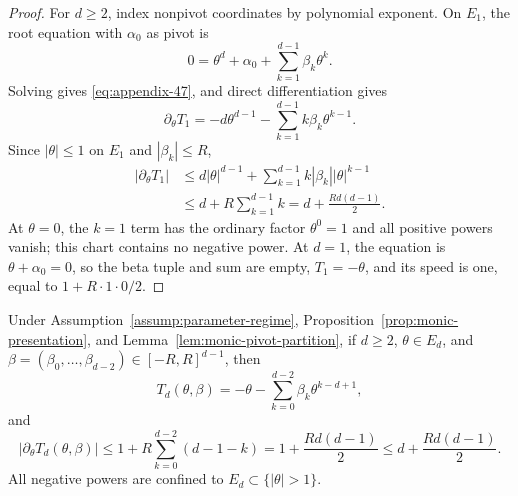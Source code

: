 \begin{proof}
For $d\geq2$, index nonpivot coordinates by polynomial exponent.  On $E_1$,
the root equation with $\alpha_0$ as pivot is
\[
0=\theta^d+\alpha_0+\sum_{k=1}^{d-1}\beta_k\theta^k.
\]
Solving gives \eqref{eq:appendix-47}, and direct differentiation gives
\[
\partial_\theta T_1
=-d\theta^{d-1}-\sum_{k=1}^{d-1}k\beta_k\theta^{k-1}.
\]
Since $|\theta|\leq1$ on $E_1$ and $|\beta_k|\leq R$,
\[
\begin{aligned}
|\partial_\theta T_1|
&\leq d|\theta|^{d-1}
 +\sum_{k=1}^{d-1}k|\beta_k||\theta|^{k-1}\\
&\leq d+R\sum_{k=1}^{d-1}k
=d+\frac{Rd(d-1)}2.
\end{aligned}
\]
At $\theta=0$, the $k=1$ term has the ordinary factor
$\theta^0=1$ and all positive powers vanish; this chart contains no negative
power.  At $d=1$, the equation is $\theta+\alpha_0=0$, so the beta tuple and
sum are empty, $T_1=-\theta$, and its speed is one, equal to
$1+R\cdot1\cdot0/2$.
\end{proof}

\begin{lemma}
\label{lem:monic-high-chart}
Under Assumption~\ref{assump:parameter-regime},
Proposition~\ref{prop:monic-presentation}, and
Lemma~\ref{lem:monic-pivot-partition}, if $d\geq2$,
$\theta\in E_d$, and
$\beta=(\beta_0,\ldots,\beta_{d-2})\in[-R,R]^{d-1}$, then
\begin{equation}
T_d(\theta,\beta)
=-\theta-\sum_{k=0}^{d-2}\beta_k\theta^{k-d+1},
\label{eq:appendix-49}
\end{equation}
and
\begin{equation}
|\partial_\theta T_d(\theta,\beta)|
\leq1+R\sum_{k=0}^{d-2}(d-1-k)
=1+\frac{Rd(d-1)}2
\leq d+\frac{Rd(d-1)}2.
\label{eq:appendix-50}
\end{equation}
All negative powers are confined to $E_d\subset\{|\theta|>1\}$.
\end{lemma}

